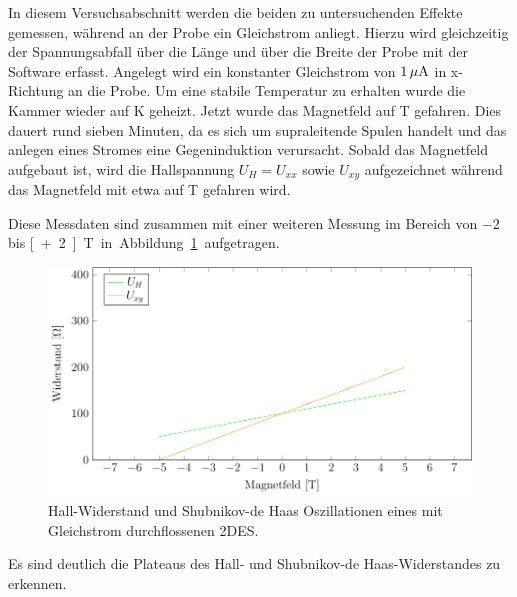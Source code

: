 
In diesem Versuchsabschnitt werden die beiden zu untersuchenden Effekte gemessen, während an der Probe ein Gleichstrom anliegt. Hierzu wird gleichzeitig der Spannungsabfall über die Länge und über die Breite der Probe mit der Software erfasst. Angelegt wird ein konstanter Gleichstrom von $\unit[1]{\mu A}$ in x-Richtung an die Probe. Um eine stabile Temperatur zu erhalten wurde die Kammer wieder auf \unit[2]{K} geheizt. Jetzt wurde das Magnetfeld auf \unit[-7]{T} gefahren. Dies dauert rund sieben Minuten, da es sich um supraleitende Spulen handelt und das anlegen eines Stromes eine Gegeninduktion verursacht. Sobald das Magnetfeld aufgebaut ist, wird die Hallspannung $U_H=U_{xx}$ sowie $U_{xy}$ aufgezeichnet während das Magnetfeld mit etwa  auf \unit[7]{T} gefahren wird. 


Diese Messdaten sind zusammen mit einer weiteren Messung im Bereich von $-2$ bis \unit[+2]{T} in Abbildung~\ref{fig:full_range_dc} aufgetragen.

\begin{figure}[h]
	\centering
	\includegraphics{graphs/dc/full_range.pdf}
	\caption[Gleichstrommessung im maximalen Magnetfeldbereich]{
		Hall-Widerstand und Shubnikov-de Haas Oszillationen eines mit Gleichstrom durchflossenen 2DES.
	}
	\label{fig:full_range_dc}
\end{figure}

Es sind deutlich die Plateaus des Hall- und Shubnikov-de Haas-Widerstandes zu erkennen.